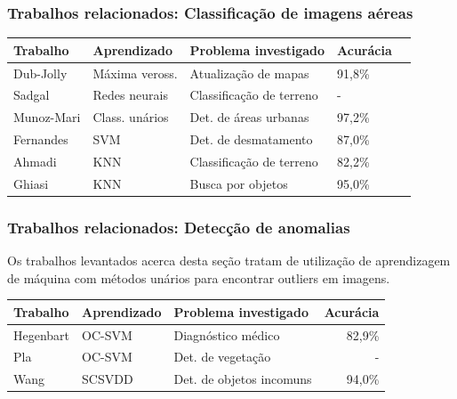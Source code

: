 \documentclass[t]{beamer}
\begin{document}
\begin{frame}[c]
	\frametitle{Trabalhos relacionados: Classificação de imagens aéreas}
	\small{
		\begin{table}[h]
		\centering
		\begin{tabulary}{\linewidth}{|L|L|L|L|C|}
		\hline
		\textbf{Trabalho} &  \textbf{Aprendizado} & \textbf{Problema investigado} &  \textbf{Acurácia} \\ \hline
		Dub-Jolly  & Máxima veross. & Atualização de mapas      & 91,8\%  \\ \hline
		Sadgal     & Redes neurais  & Classificação de terreno  & -       \\ \hline
		Munoz-Mari & Class. unários & Det. de áreas urbanas     & 97,2\%  \\ \hline
		Fernandes  & SVM            & Det. de desmatamento      & 87,0\%  \\ \hline
		Ahmadi     & KNN            & Classificação de terreno  & 82,2\% \\ \hline
		Ghiasi     & KNN            & Busca por objetos         & 95,0\%  \\ \hline
		\end{tabulary}
		\end{table}
	}
\end{frame}


\begin{frame}[c]
	\frametitle{Trabalhos relacionados: Detecção de anomalias}

	\vspace{0.5cm}

	Os trabalhos levantados acerca desta seção tratam de utilização de aprendizagem de máquina com métodos unários para encontrar outliers em imagens.
	
	\vspace{0.5cm}

	\small{
		\begin{table}[h]
		\begin{tabulary}{\linewidth}{|L|L|L|R|}
			\hline
			\textbf{Trabalho} & \textbf{Aprendizado} & \textbf{Problema investigado} & \textbf{Acurácia} \\ \hline
			Hegenbart & OC-SVM & Diagnóstico médico       & 82,9\% \\ \hline
			Pla       & OC-SVM & Det. de vegetação        & -      \\ \hline
			Wang      & SCSVDD & Det. de objetos incomuns & 94,0\% \\ \hline
		\end{tabulary}
		\end{table}
	}
\end{frame}
\end{document}
